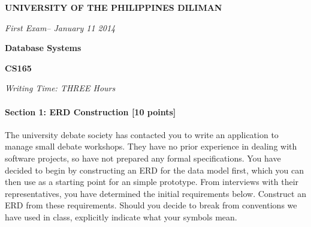 \documentclass[a4paper,12pt,leqno]{article}
\newcommand{\institution}{UNIVERSITY OF THE PHILIPPINES DILIMAN}
\newcommand{\titlehd}{Database Systems}
\newcommand{\examtype}{First Exam}
\newcommand{\examdate}{January 11 2014}
\newcommand{\examcode}{CS165}
\newcommand{\writetime}{THREE Hours}
\begin{document}

\begin{center}
\large\textbf{\institution}
\end{center}
\vspace{1cm}

\begin{center}
\textit{ \examtype -- \examdate}
\end{center}
\vspace{1cm}

\begin{center}
\large\textbf{\titlehd}
\end{center}

\begin{center}
\large\textbf{\examcode}
\end{center}
\vspace{4cm}

\begin{center}
\textit{Writing Time:  \writetime}
\end{center}


\newpage
\paragraph{\textbf{Section 1: ERD Construction [10 points]}\\}
The university debate society has contacted you to write an application to manage small debate workshops. They have no prior experience in dealing with software projects, so have not prepared any formal specifications. You have decided to begin by constructing an ERD for the data model first, which you can then use as a starting point for an simple prototype. From interviews with their representatives, you have determined the initial requirements below. Construct an ERD from these requirements. Should you decide to break from conventions we have used in class, explicitly indicate what your symbols mean.
\end{document}
